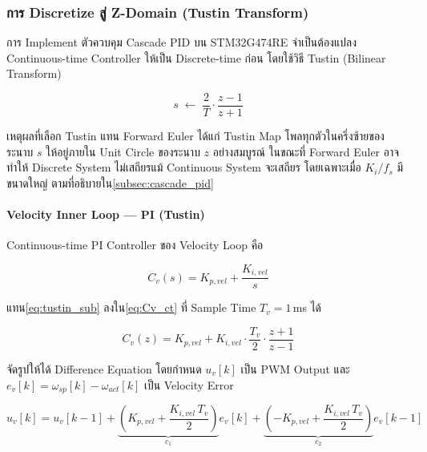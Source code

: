 \subsubsection{การ Discretize สู่ Z-Domain (Tustin Transform)}
\label{subsubsec:discretization}

การ Implement ตัวควบคุม Cascade PID บน STM32G474RE
จำเป็นต้องแปลง Continuous-time Controller
ให้เป็น Discrete-time ก่อน
โดยใช้วิธี Tustin (Bilinear Transform)

\begin{equation}
    s \;\longleftarrow\; \frac{2}{T}\cdot\frac{z-1}{z+1}
    \label{eq:tustin_sub}
\end{equation}

เหตุผลที่เลือก Tustin แทน Forward Euler ได้แก่
Tustin Map โพลทุกตัวในครึ่งซ้ายของระนาบ $s$
ให้อยู่ภายใน Unit Circle ของระนาบ $z$ อย่างสมบูรณ์
ในขณะที่ Forward Euler อาจทำให้ Discrete System
ไม่เสถียรแม้ Continuous System จะเสถียร
โดยเฉพาะเมื่อ $K_i/f_s$ มีขนาดใหญ่
ตามที่อธิบายใน\cref{subsec:cascade_pid}

\paragraph{Velocity Inner Loop — PI (Tustin)}

Continuous-time PI Controller ของ Velocity Loop คือ

\begin{equation}
    C_v(s) = K_{p,vel} + \frac{K_{i,vel}}{s}
    \label{eq:Cv_ct}
\end{equation}

แทน\cref{eq:tustin_sub} ลงใน\cref{eq:Cv_ct}
ที่ Sample Time $T_v = 1$\,ms ได้

\begin{equation}
    C_v(z) = K_{p,vel}
           + K_{i,vel}\cdot\frac{T_v}{2}\cdot\frac{z+1}{z-1}
    \label{eq:Cv_z}
\end{equation}

จัดรูปให้ได้ Difference Equation
โดยกำหนด $u_v[k]$ เป็น PWM Output
และ $e_v[k] = \omega_{sp}[k] - \omega_{act}[k]$
เป็น Velocity Error

\begin{equation}
    u_v[k] = u_v[k-1]
           + \underbrace{\left(K_{p,vel} + \frac{K_{i,vel}\,T_v}{2}\right)}_{c_1}
             e_v[k]
           + \underbrace{\left(-K_{p,vel} + \frac{K_{i,vel}\,T_v}{2}\right)}_{c_2}
             e_v[k-1]
    \label{eq:vel_diff_eq}
\end{equation}

